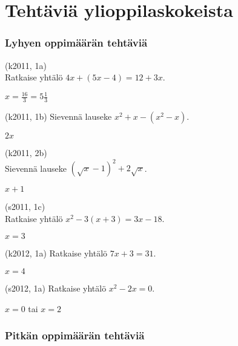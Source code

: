 \section{Tehtäviä ylioppilaskokeista}

\subsubsection*{Lyhyen oppimäärän tehtäviä}

\begin{tehtava}
(k2011, 1a) \\ Ratkaise yhtälö $4x+(5x-4) = 12+3x$.
\begin{vastaus}
$x=\frac{16}{3} = 5\frac13$
\end{vastaus}
\end{tehtava}

\begin{tehtava}
(k2011, 1b) Sievennä lauseke $x^2+x-(x^2-x)$.
\begin{vastaus}
$2x$
\end{vastaus}
\end{tehtava}

\begin{tehtava}
(k2011, 2b) \\ Sievennä lauseke $(\sqrt{x}-1)^2+2\sqrt{x}$.
\begin{vastaus}
$x+1$
\end{vastaus}
\end{tehtava}

\begin{tehtava}
(s2011, 1c) \\ Ratkaise yhtälö $x^2-3(x+3) = 3x-18$.
\begin{vastaus}
$x=3$
\end{vastaus}
\end{tehtava}

\begin{tehtava}
(k2012, 1a) Ratkaise yhtälö $7x+3 = 31$.
\begin{vastaus}
$x = 4$
\end{vastaus}
\end{tehtava}

\begin{tehtava}
(s2012, 1a) Ratkaise yhtälö $x^2-2x = 0$.
\begin{vastaus}
$x=0$ tai $x=2$
\end{vastaus}
\end{tehtava}

\subsubsection*{Pitkän oppimäärän tehtäviä}

